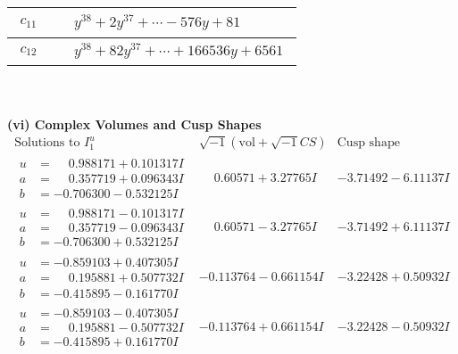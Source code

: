 \documentclass[1p]{elsarticle_modified}
\theoremstyle{definition}
\newcommand{\I}{\sqrt{-1}}
\begin{document}
\begin{tabular}{m{50pt}|m{274pt}}
\hline $$\begin{aligned}c_{11}\end{aligned}$$&$\begin{aligned}
&y^{38}+2 y^{37}+\cdots-576 y+81
\end{aligned}$\\
\hline $$\begin{aligned}c_{12}\end{aligned}$$&$\begin{aligned}
&y^{38}+82 y^{37}+\cdots+166536 y+6561
\end{aligned}$\\
\hline
\end{tabular}\\~\\
\newpage\flushleft \textbf{(vi) Complex Volumes and Cusp Shapes}
$$\begin{array}{c|c|c}  
\text{Solutions to }I^u_{1}& \I (\text{vol} + \sqrt{-1}CS) & \text{Cusp shape}\\
 \hline 
\begin{aligned}
u &= \phantom{-}0.988171 + 0.101317 I \\
a &= \phantom{-}0.357719 + 0.096343 I \\
b &= -0.706300 - 0.532125 I\end{aligned}
 & \phantom{-}0.60571 + 3.27765 I & -3.71492 - 6.11137 I \\ \hline\begin{aligned}
u &= \phantom{-}0.988171 - 0.101317 I \\
a &= \phantom{-}0.357719 - 0.096343 I \\
b &= -0.706300 + 0.532125 I\end{aligned}
 & \phantom{-}0.60571 - 3.27765 I & -3.71492 + 6.11137 I \\ \hline\begin{aligned}
u &= -0.859103 + 0.407305 I \\
a &= \phantom{-}0.195881 + 0.507732 I \\
b &= -0.415895 - 0.161770 I\end{aligned}
 & -0.113764 - 0.661154 I & -3.22428 + 0.50932 I \\ \hline\begin{aligned}
u &= -0.859103 - 0.407305 I \\
a &= \phantom{-}0.195881 - 0.507732 I \\
b &= -0.415895 + 0.161770 I\end{aligned}
 & -0.113764 + 0.661154 I & -3.22428 - 0.50932 I \\ \hline\begin{aligned}

\end{aligned}
\end{array}$$
\end{document}
